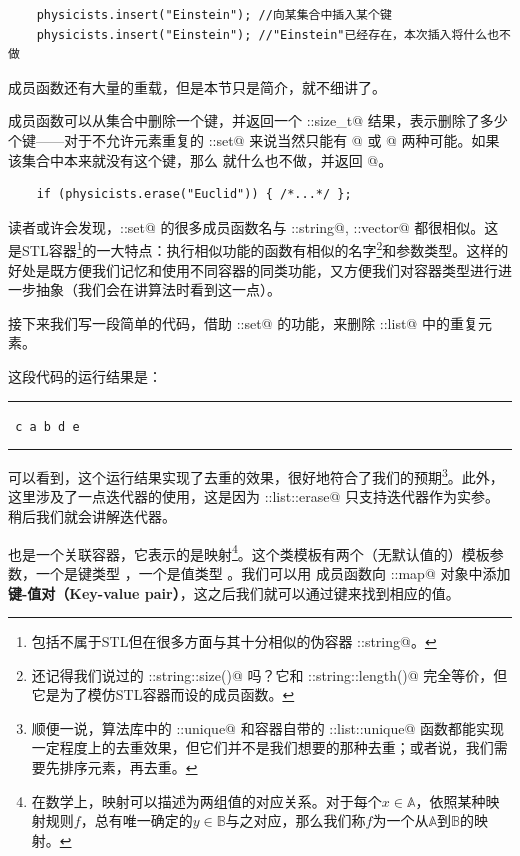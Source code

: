 \begin{lstlisting}
    physicists.insert("Einstein"); //向某集合中插入某个键
    physicists.insert("Einstein"); //"Einstein"已经存在，本次插入将什么也不做
\end{lstlisting}
\lstinline@insert@ 成员函数还有大量的重载，但是本节只是简介，就不细讲了。\par
\lstinline@erase@ 成员函数可以从集合中删除一个键，并返回一个 \lstinline@std::size_t@ 结果，表示删除了多少个键——对于不允许元素重复的 \lstinline@std::set@ 来说当然只能有 @ 或 @ 两种可能。如果该集合中本来就没有这个键，那么 \lstinline@erase@ 就什么也不做，并返回 @。
\begin{lstlisting}
    if (physicists.erase("Euclid")) { /*...*/ };
\end{lstlisting}\par
读者或许会发现，\lstinline@std::set@ 的很多成员函数名与 \lstinline@std::string@, \lstinline@std::vector@ 都很相似。这是STL容器\footnote{包括不属于STL但在很多方面与其十分相似的伪容器 \lstinline@std::string@。}的一大特点：执行相似功能的函数有相似的名字\footnote{还记得我们说过的 \lstinline@std::string::size()@ 吗？它和 \lstinline@std::string::length()@ 完全等价，但它是为了模仿STL容器而设的成员函数。}和参数类型。这样的好处是既方便我们记忆和使用不同容器的同类功能，又方便我们对容器类型进行进一步抽象（我们会在讲算法时看到这一点）。\par
接下来我们写一段简单的代码，借助 \lstinline@std::set@ 的功能，来删除 \lstinline@std::list@ 中的重复元素。

这段代码的运行结果是：\\\noindent\rule{\linewidth}{.2pt}\texttt{
c a b d e
}\\\noindent\rule{\linewidth}{.2pt}
可以看到，这个运行结果实现了去重的效果，很好地符合了我们的预期\footnote{顺便一说，算法库中的 \lstinline@std::unique@ 和容器自带的 \lstinline@std::list::unique@ 函数都能实现一定程度上的去重效果，但它们并不是我们想要的那种去重；或者说，我们需要先排序元素，再去重。}。此外，这里涉及了一点迭代器的使用，这是因为 \lstinline@std::list::erase@ 只支持迭代器作为实参。稍后我们就会讲解迭代器。\par
\lstinline@map@ 也是一个关联容器，它表示的是映射\footnote{在数学上，映射可以描述为两组值的对应关系。对于每个$x\in\mathbb A$，依照某种映射规则$f$，总有唯一确定的$y\in\mathbb B$与之对应，那么我们称$f$为一个从$\mathbb A$到$\mathbb B$的映射。}。这个类模板有两个（无默认值的）模板参数，一个是键类型 \lstinline@Key@，一个是值类型 \lstinline@T@。我们可以用 \lstinline@insert@ 成员函数向 \lstinline@std::map@ 对象中添加\textbf{键-值对（Key-value pair）}，这之后我们就可以通过键来找到相应的值。
